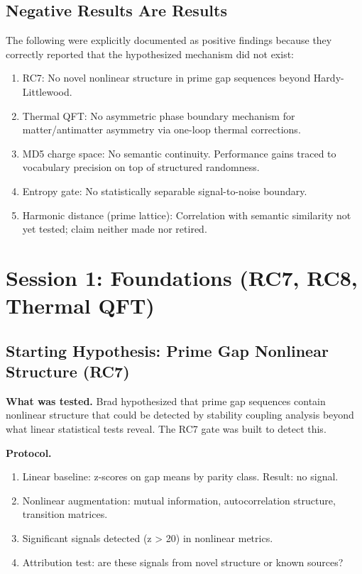 \documentclass[11pt,twoside]{article}
\begin{document}
\subsection{Negative Results Are Results}

The following were explicitly documented as positive findings because they correctly
reported that the hypothesized mechanism did not exist:

\begin{enumerate}
  \item RC7: No novel nonlinear structure in prime gap sequences beyond Hardy-Littlewood.
  \item Thermal QFT: No asymmetric phase boundary mechanism for matter/antimatter asymmetry via one-loop thermal corrections.
  \item MD5 charge space: No semantic continuity. Performance gains traced to vocabulary precision on top of structured randomness.
  \item Entropy gate: No statistically separable signal-to-noise boundary.
  \item Harmonic distance (prime lattice): Correlation with semantic similarity not yet tested; claim neither made nor retired.
\end{enumerate}

\section{Session 1: Foundations (RC7, RC8, Thermal QFT)}

\subsection{Starting Hypothesis: Prime Gap Nonlinear Structure (RC7)}

\textbf{What was tested.} Brad hypothesized that prime gap sequences contain
nonlinear structure that could be detected by stability coupling analysis beyond
what linear statistical tests reveal. The RC7 gate was built to detect this.

\textbf{Protocol.}
\begin{enumerate}
  \item Linear baseline: z-scores on gap means by parity class. Result: no signal.
  \item Nonlinear augmentation: mutual information, autocorrelation structure, transition matrices.
  \item Significant signals detected (z > 20) in nonlinear metrics.
  \item Attribution test: are these signals from novel structure or known sources?
\end{enumerate}
\end{document}
